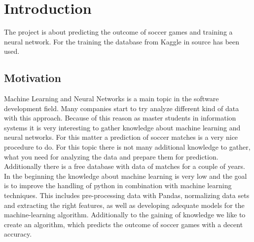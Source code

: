 
\chapter{Introduction}

The project is about predicting the outcome of soccer games and training a neural network. For the training the database from Kaggle in source \cite{kggl:2019} has been used. 


\section{Motivation}
 Machine Learning and Neural Networks is a main topic in the software development field. Many companies start to try analyze different kind of data with this approach. Because of this reason as master students in information systems it is very interesting to gather knowledge about machine learning and neural networks. For this matter a prediction of soccer matches is a very nice procedure to do. For this topic there is not many additional knowledge to gather, what you need for analyzing the data and prepare them for prediction. Additionally there is a free database with data of matches for a couple of years. In the beginning the knowledge about machine learning is very low and the goal is to improve the handling of python in combination with machine learning techniques. This includes pre-processing data with Pandas, normalizing data sets and extracting the right features, as well as developing adequate models for the machine-learning algorithm. Additionally to the gaining of knowledge we like to create an algorithm, which predicts the outcome of soccer games with a decent accuracy.
